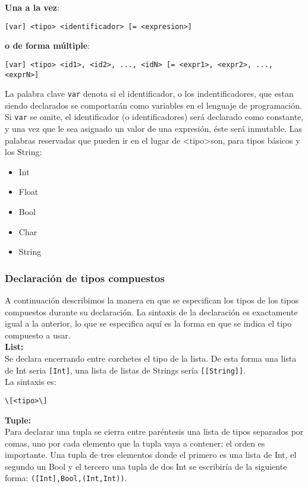 \documentclass[12pt, spanish]{report}
\begin{document}
\textbf{Una a la vez}:
\begin{verbatim}
[var] <tipo> <identificador> [= <expresion>]
\end{verbatim}

\textbf{o de forma m\'ultiple}:
\begin{verbatim}
[var] <tipo> <id1>, <id2>, ..., <idN> [= <expr1>, <expr2>, ..., <exprN>]
\end{verbatim}

La palabra clave \texttt{var} denota si el identificador, o los
indentificadores, que estan siendo declarados se comportar\'an como
variables en el lenguaje de programaci\'on. Si \texttt{var} se omite,
el identificador (o identificadores) ser\'a declarado como constante,
y una vez que le sea asignado un valor de una expresi\'on, \'este
ser\'a inmutable. Las palabras reservadas que pueden ir en el lugar de
\textless tipo\textgreater son, para tipos b\'asicos y los String:

\begin{itemize}
\item Int
\item Float
\item Bool
\item Char
\item String
\end{itemize}

\subsubsection{Declaraci\'on de tipos compuestos}
\label{sec:declc}
A continuaci\'on describimos la manera en que se especifican los tipos
de los tipos compuestos durante su declaraci\'on. La sintaxis de la
declaraci\'on es exactamente igual a la anterior, lo que se especifica
aqu\'i es la forma en que se indica el tipo compuesto a usar.\\

\textbf{List:}\\
Se declara encerrando entre corchetes el tipo de la
lista. De esta forma una lista de Int seria \texttt{[Int]}, una lista
de listas de Strings ser\'ia \texttt{[[String]]}.\\

La sintaxis es:
\begin{verbatim}
\[<tipo>\]
\end{verbatim}

\textbf{Tuple:}\\
Para declarar una tupla se cierra entre par\'entesis una lista de
tipos separados por comas, uno por cada elemento que la tupla vaya a
contener; el orden es importante. Una tupla de tres elementos donde el
primero es una lista de Int, el segundo un Bool y el tercero una tupla
de dos Int se escribir\'ia de la siguiente forma:
\texttt{([Int],Bool,(Int,Int))}.\\
\end{document}
